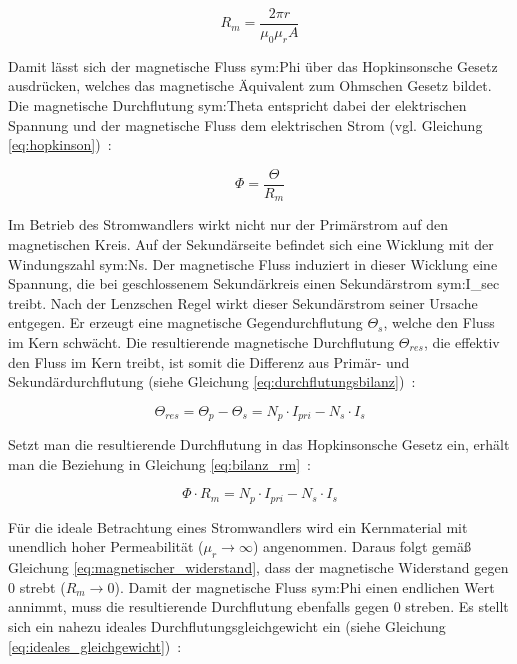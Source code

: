 \begin{equation}
    R_m = \frac{2\pi r}{\mu_0 \mu_r A}
    \label{eq:magnetischer_widerstand}
\end{equation}

Damit lässt sich der magnetische Fluss \gls{sym:Phi} über das Hopkinsonsche Gesetz ausdrücken, welches das magnetische Äquivalent zum Ohmschen Gesetz bildet. Die magnetische Durchflutung \gls{sym:Theta} entspricht dabei der elektrischen Spannung und der magnetische Fluss dem elektrischen Strom (vgl. Gleichung \eqref{eq:hopkinson})~\cite[Kap.~11.9]{book-Magnetisches_Feld_Moeller-Harriehausen}:

\begin{equation}
    \Phi = \frac{\Theta}{R_m}
    \label{eq:hopkinson}
\end{equation}

Im Betrieb des Stromwandlers wirkt nicht nur der Primärstrom auf den magnetischen Kreis. Auf der Sekundärseite befindet sich eine Wicklung mit der Windungszahl \gls{sym:Ns}. Der magnetische Fluss induziert in dieser Wicklung eine Spannung, die bei geschlossenem Sekundärkreis einen Sekundärstrom \gls{sym:I_sec} treibt. Nach der Lenzschen Regel wirkt dieser Sekundärstrom seiner Ursache entgegen. Er erzeugt eine magnetische Gegendurchflutung $\Theta_{s}$, welche den Fluss im Kern schwächt. Die resultierende magnetische Durchflutung $\Theta_{res}$, die effektiv den Fluss im Kern treibt, ist somit die Differenz aus Primär- und Sekundärdurchflutung (siehe Gleichung \eqref{eq:durchflutungsbilanz})~\cite[S.~67]{book-Technologie_Messwandler-Minkner}\cite[S.~20]{pdf-Skript_Induktion-Rolink}\cite[S.~75]{book-Technologie_Messwandler-Minkner}:

\begin{equation}
    \Theta_{res} = \Theta_{p} - \Theta_{s} = N_{p} \cdot I_{pri} - N_{s} \cdot I_{s}
    \label{eq:durchflutungsbilanz}
\end{equation}

Setzt man die resultierende Durchflutung in das Hopkinsonsche Gesetz ein, erhält man die Beziehung in Gleichung \eqref{eq:bilanz_rm}~\cite[Kap.~11.9]{book-Magnetisches_Feld_Moeller-Harriehausen}:

\begin{equation}
    \Phi \cdot R_m = N_{p} \cdot I_{pri} - N_{s} \cdot I_{s}
    \label{eq:bilanz_rm}
\end{equation}

Für die ideale Betrachtung eines Stromwandlers wird ein Kernmaterial mit unendlich hoher Permeabilität ($\mu_r \to \infty$) angenommen. Daraus folgt gemäß Gleichung \eqref{eq:magnetischer_widerstand}, dass der magnetische Widerstand gegen \num{0} strebt ($R_m \to 0$). Damit der magnetische Fluss \gls{sym:Phi} einen endlichen Wert annimmt, muss die resultierende Durchflutung ebenfalls gegen \num{0} streben. Es stellt sich ein nahezu ideales Durchflutungsgleichgewicht ein (siehe Gleichung \eqref{eq:ideales_gleichgewicht})~\cite[Kap.~11]{book-Magnetisches_Feld_Moeller-Harriehausen}\cite[S.~75]{book-Technologie_Messwandler-Minkner}:

